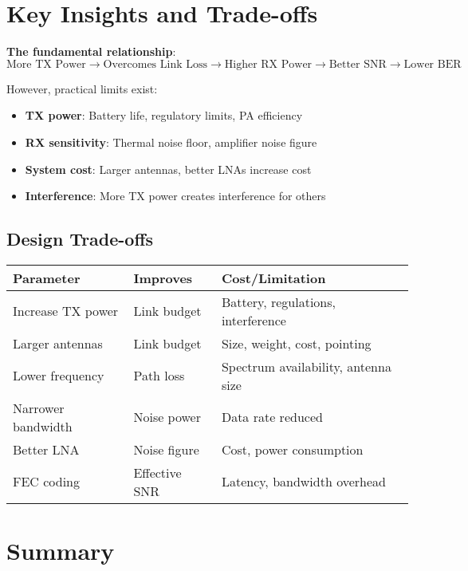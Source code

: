 \section{Key Insights and Trade-offs}

\begin{keyconcept}
\textbf{The fundamental relationship}:
\[
\text{More TX Power} \rightarrow \text{Overcomes Link Loss} \rightarrow \text{Higher RX Power} \rightarrow \text{Better SNR} \rightarrow \text{Lower BER}
\]

However, practical limits exist:
\begin{itemize}
\item \textbf{TX power}: Battery life, regulatory limits, PA efficiency
\item \textbf{RX sensitivity}: Thermal noise floor, amplifier noise figure
\item \textbf{System cost}: Larger antennas, better LNAs increase cost
\item \textbf{Interference}: More TX power creates interference for others
\end{itemize}
\end{keyconcept}

\subsection{Design Trade-offs}

\begin{center}
\begin{tabular}{@{}lll@{}}
\toprule
\textbf{Parameter} & \textbf{Improves} & \textbf{Cost/Limitation} \\
\midrule
Increase TX power & Link budget & Battery, regulations, interference \\
Larger antennas & Link budget & Size, weight, cost, pointing \\
Lower frequency & Path loss & Spectrum availability, antenna size \\
Narrower bandwidth & Noise power & Data rate reduced \\
Better LNA & Noise figure & Cost, power consumption \\
FEC coding & Effective SNR & Latency, bandwidth overhead \\
\bottomrule
\end{tabular}
\end{center}

\section{Summary}

